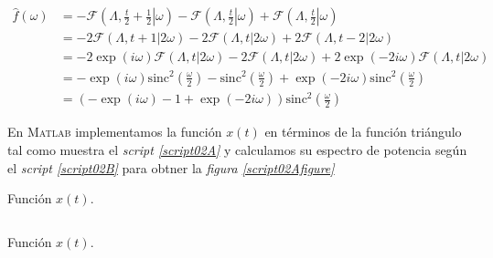 \documentclass[a4paper,12pt,final]{article}
\begin{document}
        \begin{equation*}
          \begin{split}
            \widehat{f}\left(\omega\right) & = - \mathcal{F}\left(\Lambda,\left.\frac{t}{2} + \frac{1}{2} \right|\omega\right) - \mathcal{F}\left(\Lambda,\left.\frac{t}{2}\right|\omega\right) + \mathcal{F}\left(\Lambda,\left.\frac{t}{2}\right|\omega\right) \\
                                           & = - 2 \mathcal{F}\left(\Lambda,t + 1 |2 \omega\right) - 2 \mathcal{F}\left(\Lambda,t|2 \omega\right) + 2 \mathcal{F}\left(\Lambda,\left.t - 2\right| 2 \omega\right) \\
                                           & = - 2 \exp\left(i \omega\right) \mathcal{F}\left(\Lambda,t |2 \omega\right) - 2 \mathcal{F}\left(\Lambda,t|2 \omega\right) + 2 \exp\left(- 2 i \omega\right) \mathcal{F}\left(\Lambda,t| 2 \omega\right) \\
                                           & = - \exp\left(i \omega\right) \mathrm{sinc}^{2}\left(\frac{\omega}{2}\right) - \mathrm{sinc}^{2}\left(\frac{\omega}{2}\right) + \exp\left(- 2 i \omega\right) \mathrm{sinc}^{2}\left(\frac{\omega}{2}\right) \\
                                           & = \left( - \exp\left(i \omega\right) - 1 + \exp\left(- 2 i \omega\right) \right) \mathrm{sinc}^{2}\left(\frac{\omega}{2}\right)
          \end{split}
        \end{equation*}

      \noindent En \textsc{Matlab} implementamos la función $x\left(t\right)$
        en términos de la función triángulo tal como muestra el \emph{script
        \ref{script02A}} y calculamos su espectro de potencia según el
        \emph{script \ref{script02B}} para obtner la \emph{figura
        \ref{script02Afigure}}

        \begin{listing}[H]
          \caption{Función $x\left(t\right)$.}
          \label{script02A}
          \inputminted{matlab}{./laboratorio_4/p2_x.m}
        \end{listing}

        \begin{listing}[H]
          \caption{Función $x\left(t\right)$.}
          \label{script02B}
          \inputminted{matlab}{./laboratorio_4/problema02.m}
        \end{listing}
\end{document}
